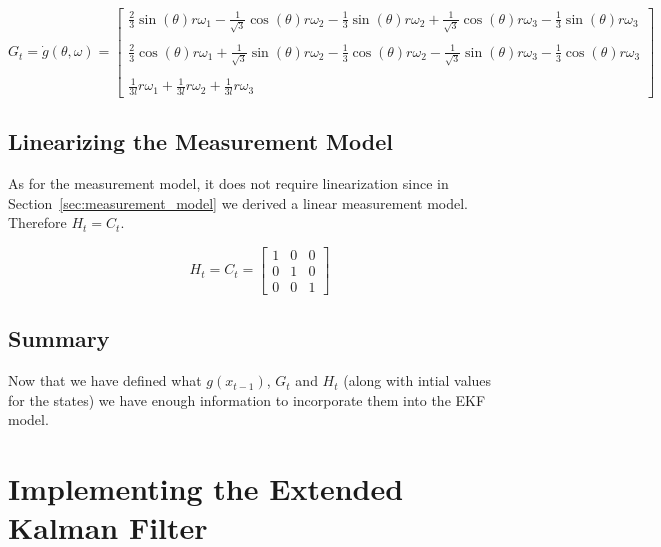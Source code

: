 \documentclass{article}
\begin{document}
\begin{equation}
	G_{t} = \dot{g}(\theta, \omega) =
	\begin{bmatrix}
		\frac{2}{3} \sin(\theta) r \omega_{1}
			- \frac{1}{\sqrt{3}} \cos(\theta) r \omega_{2}
				- \frac{1}{3} \sin(\theta) r \omega_{2}
			+ \frac{1}{\sqrt{3}} \cos(\theta) r \omega_{3}
				- \frac{1}{3} \sin(\theta) r \omega_{3} \\ \\
		\frac{2}{3} \cos(\theta) r \omega_{1}
			+ \frac{1}{\sqrt{3}} \sin(\theta) r \omega_{2}
				-\frac{1}{3} \cos(\theta)r \omega_{2}
			- \frac{1}{\sqrt{3}} \sin(\theta) r \omega_{3}
				-\frac{1}{3} \cos(\theta) r \omega_{3} \\ \\
		\frac{1}{3l} r \omega_{1}
			+ \frac{1}{3l} r \omega_{2}
			+ \frac{1}{3l} r \omega_{3}
	\end{bmatrix}
\end{equation}



\newpage
\subsection{Linearizing the Measurement Model}
\label{subsec:ekf_measurement_model_linearization}

As for the measurement model, it does not require linearization since in 
Section~\ref{sec:measurement_model} we derived a linear measurement model. 
Therefore $H_{t} = C_{t}$.

\begin{equation}
	H_{t} = C_{t} = 
	\begin{bmatrix}
		1 & 0 & 0 \\
		0 & 1 & 0 \\
		0 & 0 & 1
	\end{bmatrix}
\end{equation}



\subsection{Summary}
\label{subsec:ekf_def_summary}

Now that we have defined what $g(x_{t - 1})$, $G_{t}$ and $H_{t}$ (along with
 intial values for the states) we have enough information to incorporate them
  into the EKF model.



\newpage
\section{Implementing the Extended Kalman Filter}
\end{document}
